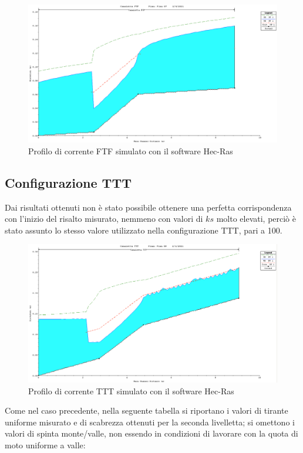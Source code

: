 \documentclass[12pt]{article} %
\begin{document}
\begin{figure}[H]
    \centering
    \includegraphics[scale=0.35]{FTF ks110.png}
    \caption{Profilo di corrente FTF simulato con il software Hec-Ras}
\end{figure}

\subsection{Configurazione TTT}

\noindent  Dai risultati ottenuti non è stato possibile ottenere una perfetta corrispondenza con l’inizio del risalto misurato, nemmeno con valori di $ks$ molto elevati, perciò è stato assunto lo stesso valore utilizzato nella configurazione TTT, pari a 100. 

\begin{figure}[H]
    \centering
    \includegraphics[scale=0.35]{Profilo HEC-RAS TTT 2.png}
    \caption{Profilo di corrente TTT simulato con il software Hec-Ras}

\end{figure}

\noindent Come nel caso precedente, nella seguente tabella si riportano i valori di tirante uniforme misurato e di scabrezza ottenuti per la seconda livelletta; si omettono i valori di spinta monte/valle, non essendo in condizioni di lavorare con la quota di moto uniforme a valle:
\end{document}
